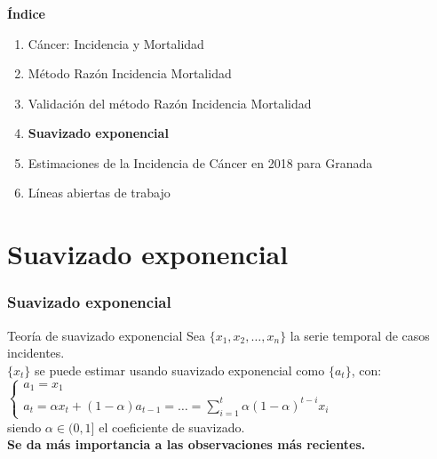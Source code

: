 \documentclass{beamer}
\begin{document}

\begin{frame}\frametitle{}

	\Large{\textbf{Índice}}\\[2ex]
	\normalsize
	\begin{enumerate}
		\item Cáncer: Incidencia y Mortalidad \\[2ex]
		\item Método Razón Incidencia Mortalidad \\[2ex]
		\item Validación del método Razón Incidencia Mortalidad \\[2ex]
		\item \textbf{Suavizado exponencial} \\[2ex]
		\item  Estimaciones de la Incidencia de Cáncer en 2018 para Granada \\[2ex]
		\item Líneas abiertas de trabajo
	\end{enumerate}

\end{frame}

\section{Suavizado exponencial}
\begin{frame}\frametitle{Suavizado exponencial}

	\begin{block}{Teoría de suavizado exponencial}
		Sea $\{x_1, x_2, \dots, x_n\}$ la serie temporal de casos incidentes.\\[2ex]
		
		$\{x_t\}$ se puede estimar usando suavizado exponencial como $\{a_t\}$, con:\\[2ex]
		
		\begin{math}
		\left\{
		\begin{array}{l}
		a_1 = x_1\\[2ex]
		a_t = \alpha x_t + (1-\alpha) a_{t-1} = \ldots = \sum_{i=1}^t \alpha (1-\alpha)^{t-i} x_i
		\end{array}
		\right.
		\end{math}\\[2ex]
		
siendo $\alpha \in (0, 1]$ el coeficiente de suavizado.\\[2ex]
		
		\textbf{Se da más importancia a las observaciones más recientes.}\\
	
	\end{block}

\end{frame}
\end{document}
